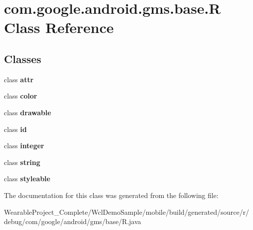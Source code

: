 \hypertarget{classcom_1_1google_1_1android_1_1gms_1_1base_1_1R}{}\section{com.\+google.\+android.\+gms.\+base.\+R Class Reference}
\label{classcom_1_1google_1_1android_1_1gms_1_1base_1_1R}
\subsection*{Classes}
\begin{DoxyCompactItemize}
\item 
class {\bfseries attr}
\item 
class {\bfseries color}
\item 
class {\bfseries drawable}
\item 
class {\bfseries id}
\item 
class {\bfseries integer}
\item 
class {\bfseries string}
\item 
class {\bfseries styleable}
\end{DoxyCompactItemize}


The documentation for this class was generated from the following file\+:\begin{DoxyCompactItemize}
\item 
Wearable\+Project\+\_\+\+Complete/\+Wcl\+Demo\+Sample/mobile/build/generated/source/r/debug/com/google/android/gms/base/R.\+java\end{DoxyCompactItemize}
